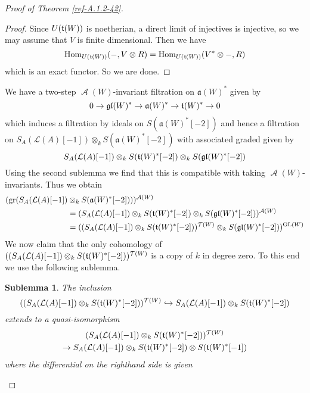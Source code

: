 \documentclass{amsart}
\numberwithin{equation}{section}
\let\cal\mathcal
\newtheorem*{sublemma}{Sublemma}
\theoremstyle{definition}
\theoremstyle{remark}
\begin{document}
\begin{proof}[Proof of Theorem \ref{ref-A.1.2-42}]
\begin{proof}
Since $U(\frak{t}(W))$ is noetherian, a direct limit of injectives is injective,
so we may assume that $V$ is finite dimensional. Then we have
\[
{\operatorname {Hom}}_{U(\frak{t}(W))}(-,V\otimes R)={\operatorname {Hom}}_{U(\frak{t}(W))}(V^\ast\otimes-,R)
\]
which is an exact functor. So we are done. 
\end{proof}
We have a two-step ${\operatorname{{\cal A}}}(W)$-invariant filtration on ${\mathfrak{a}}(W)^\ast$ given by
\[
0\rightarrow \frak{gl}(W)^\ast\rightarrow {\mathfrak{a}}(W)^\ast \rightarrow \frak{t}(W)^\ast\rightarrow 0
\]
which induces a filtration by ideals on 
$S({\mathfrak{a}}(W)^\ast[-2])$ and hence a filtration on
$
S_A({{\cal L}}(A)[-1])\otimes_k S({\mathfrak{a}}(W)^\ast[-2])
$
with associated graded given by 
\[
S_A({{\cal L}}(A)[-1])\otimes_k S(\frak{t}(W)^\ast[-2])\otimes_k S(\frak{gl}(W)^\ast[-2])
\]
Using the second sublemma we find that this is compatible with taking 
${\operatorname{{\cal A}}}(W)$-invariants.  Thus we obtain
\begin{equation}
\label{ref-A.23-73}
\begin{aligned}
({\operatorname {gr}} (S_A({{\cal L}}(A)[-1])&\otimes_k S({\mathfrak{a}}(W)^\ast[-2])))^{{\operatorname{{\cal A}}}(W)}\\
&=
(S_A({{\cal L}}(A)[-1])\otimes_k S(\frak{t}(W)^\ast[-2])\otimes_k S(\frak{gl}(W)^\ast[-2]))^{{\operatorname{{\cal A}}}(W)}\\
&=((S_A({{\cal L}}(A)[-1])\otimes_k S(\frak{t}(W)^\ast[-2]))^{{{\cal T}}(W)}\otimes_k S(\frak{gl}(W)^\ast[-2]))^{{\operatorname {GL}}(W)}
\end{aligned}
\end{equation}
We now claim that the only cohomology of $((S_A({{\cal L}}(A)[-1])\otimes_k
S(\frak{t}(W)^\ast[-2]))^{{{\cal T}}(W)}$ is a copy of $k$ in degree zero.
To this end we use the following sublemma.
\begin{sublemma}
The inclusion
\[
((S_A({{\cal L}}(A)[-1])\otimes_k S(\frak{t}(W)^\ast[-2]))^{{{\cal T}}(W)}\hookrightarrow
S_A({{\cal L}}(A)[-1])\otimes_k S(\frak{t}(W)^\ast[-2])
\]
extends to a quasi-isomorphism
\begin{multline}
\label{ref-A.24-74}
(S_A({{\cal L}}(A)[-1])\otimes_k S(\frak{t}(W)^\ast[-2]))^{{{\cal T}}(W)}
\\ \rightarrow S_A({{\cal L}}(A)[-1])\otimes_k S(\frak{t}(W)^\ast[-2])\otimes S(\frak{t}(W)^\ast[-1])
\end{multline}
where the differential on the righthand side is given 
\begin{equation}

\end{equation}
\end{sublemma}
\end{proof}
\end{document}
